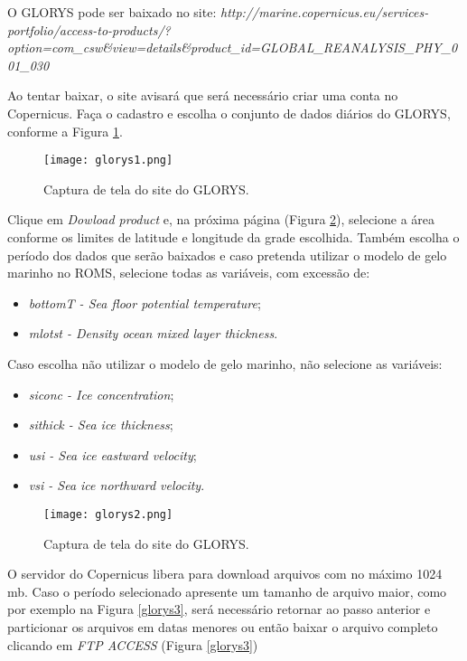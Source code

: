 \noindent O GLORYS pode ser baixado no site: \textcolor{bleu_cite}{\textit{http://marine.copernicus.eu/services-portfolio/access-to-products/?option=com\_csw\&view=details\&product\_id=GLOBAL\_REANALYSIS\_PHY\_001\_030}}
\bigskip

\noindent Ao tentar baixar, o site avisará que será necessário criar uma conta no Copernicus. Faça o cadastro e escolha o conjunto de dados diários do GLORYS, conforme a Figura \textcolor{bleu_cite}{\ref{glorys1}}.
\bigskip

\begin{figure}[H]
    \centering
    \texttt{[image: glorys1.png]}
    \caption{Captura de tela do site do GLORYS.}
    \label{glorys1}
\end{figure}
\bigskip

\noindent Clique em \textit{Dowload product} e, na próxima página (Figura \textcolor{bleu_cite}{\ref{glorys2}}), selecione a área conforme os limites de latitude e longitude da grade escolhida. Também escolha o período dos dados que serão baixados e caso pretenda utilizar o modelo de gelo marinho no ROMS, selecione todas as variáveis, com excessão de: 
\bigskip
\begin{itemize}
    \item \textit{ bottomT - Sea floor potential temperature};
    \item \textit{mlotst - Density ocean mixed layer thickness}.
\end{itemize}
\bigskip

\noindent Caso escolha não utilizar o modelo de gelo marinho, não selecione as variáveis:
\bigskip

\begin{itemize}
    \item \textit{siconc - Ice concentration};
    \item \textit{sithick - Sea ice thickness};
    \item \textit{usi - Sea ice eastward velocity};
    \item \textit{vsi - Sea ice northward velocity}.
\end{itemize}
\bigskip

\begin{figure}[H]
    \centering
    \texttt{[image: glorys2.png]}
    \caption{Captura de tela do site do GLORYS.}
    \label{glorys2}
\end{figure}
\bigskip

\noindent O servidor do Copernicus libera para download arquivos com no máximo 1024 mb. Caso o período selecionado apresente um tamanho de arquivo maior, como por exemplo na Figura \textcolor{bleu_cite}{\ref{glorys3}}, será necessário retornar ao passo anterior e particionar os arquivos em datas menores ou então baixar o arquivo completo clicando em \textit{FTP ACCESS} (Figura \textcolor{bleu_cite}{\ref{glorys3}})
\bigskip

